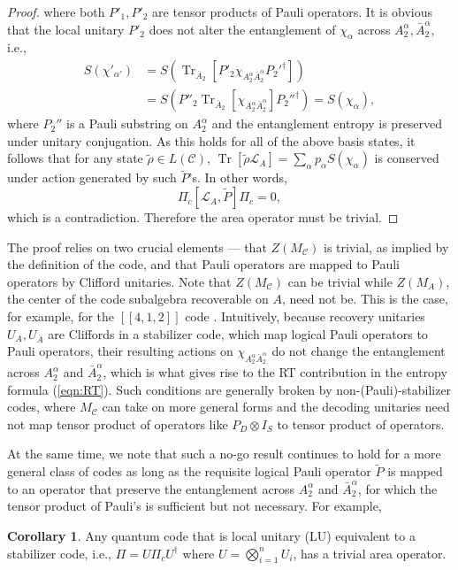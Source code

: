 \documentclass[%
 reprint,
superscriptaddress,
nofootinbib,
 amsmath,amssymb,
 aps,
prx,
floatfix,
]{revtex4-2}
\theoremstyle{definition}
\newtheorem{corollary}{Corollary}[section]
\numberwithin{equation}{section}
\DeclareMathOperator{\Tr}{Tr}
\begin{document}
\begin{proof}
 where both $P'_1, P'_2$ are tensor products of Pauli operators. 
It is obvious that the local unitary $P'_2$ does not alter the entanglement of $\chi_{\alpha}$ across $A_2^{\alpha},\bar{A}_2^{\alpha}$, i.e.,
\begin{align*}
S(\chi'_{\alpha'})&=S(\Tr_{\bar{A}_2}[P'_2\chi_{A_2^{\alpha}\bar{A}_2^{\alpha}}P_2'^{\dagger}]) \\
&= S(P''_2\Tr_{\bar{A}_2}[\chi_{A_2^{\alpha}\bar{A}_2^{\alpha}}]P_2''^{\dagger})=S(\chi_{\alpha}),
\end{align*}
where $P_2''$ is a Pauli substring on $A_2^{\alpha}$ and the entanglement entropy is preserved under unitary conjugation.
As this holds for all of the above basis states, it follows that for any state $\tilde{\rho}\in L(\mathcal{C})$, $\Tr[\tilde{\rho}\mathcal{L}_A]=\sum_{\alpha}p_{\alpha}S(\chi_{\alpha})$ is conserved under action generated by such $\tilde{P}$'s. In other words,
\begin{equation}
    \Pi_c[\mathcal{L}_A,\tilde{P}] \Pi_c=0,
\end{equation}
which is a contradiction. Therefore the area operator must be trivial.
\end{proof}

The proof relies on two crucial elements --- that $Z(M_{\mathcal{C}})$ is trivial, as implied by the definition of the code,  and that Pauli operators are mapped to Pauli operators by Clifford unitaries. 
Note that $Z(M_{\mathcal{C}})$ can be trivial while $Z(M_A)$, the center of the code subalgebra recoverable on $A$, need not be. This is the case, for example, for the $[[4,1,2]]$ code \cite{Cao:2020ksw}. 
Intuitively, 
because recovery unitaries $U_{A},U_{\bar{A}}$ are Cliffords in a stabilizer code, which map logical Pauli operators to Pauli operators, their resulting actions on $\chi_{A_2^{\alpha}\bar{A}_2^{\alpha}}$ do not change the entanglement across  $A_2^{\alpha}$ and $\bar{A}_2^{\alpha}$, which is what gives rise to the RT contribution in the entropy formula (\ref{eqn:RT}). Such conditions are generally broken by non-(Pauli)-stabilizer codes, where $M_{\mathcal{C}}$ can take on more general forms and the decoding unitaries need not map tensor product of operators like $P_{D}\otimes I_{S}$ to tensor product of operators. 

At the same time, we note that such a no-go result continues to hold for a more general class of codes as long as the requisite logical Pauli operator $\tilde{P}$ is mapped to an operator that preserve the entanglement across $A_2^{\alpha}$ and $\bar{A}_2^{\alpha}$, for which the tensor product of Pauli's is sufficient but not necessary. For example, 
\begin{corollary}\label{coro:1}
    Any quantum code that is local unitary (LU) equivalent to a stabilizer code, i.e., $\Pi = U \Pi_c U^{\dagger}$ where $U=\bigotimes_{i=1}^n U_i$, has a trivial area operator.
\end{corollary}
\end{document}
